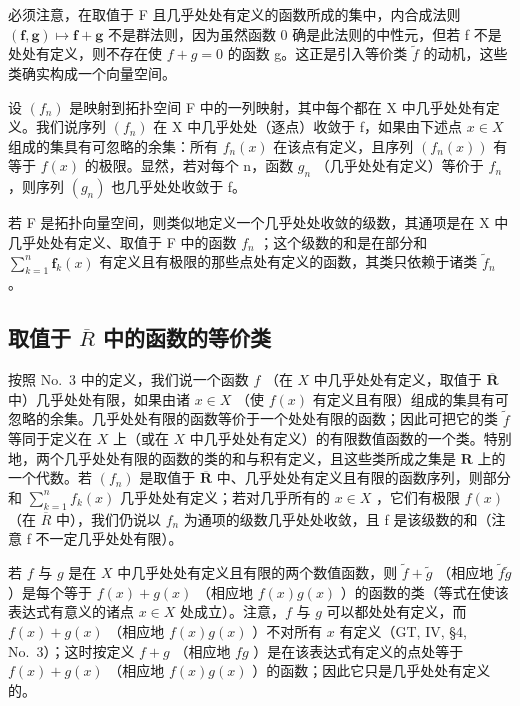 必须注意，在取值于 F 且几乎处处有定义的函数所成的集中，内合成法则 \((\mathbf{f},\mathbf{g})\mapsto\mathbf{f}+\mathbf{g}\) 不是群法则，因为虽然函数 0 确是此法则的中性元，但若 f 不是处处有定义，则不存在使 \(f+g=0\) 的函数 g。这正是引入等价类 \(\widetilde{f}\) 的动机，这些类确实构成一个向量空间。

设 \((f_n)\) 是映射到拓扑空间 F 中的一列映射，其中每个都在 X 中几乎处处有定义。我们说序列 \((f_n)\) 在 X 中几乎处处（逐点）收敛于 f，如果由下述点 \(x \in X\) 组成的集具有可忽略的余集：所有 \(f_n(x)\) 在该点有定义，且序列 \((f_n(x))\) 有等于 \(f(x)\) 的极限。显然，若对每个 n，函数 \(g_n\) （几乎处处有定义）等价于 \(f_n\) ，则序列 \((g_n)\) 也几乎处处收敛于 f。

若 F 是拓扑向量空间，则类似地定义一个几乎处处收敛的级数，其通项是在 X 中几乎处处有定义、取值于 F 中的函数 \(f_{n}\) ；这个级数的和是在部分和 \(\sum_{k=1}^{n}\mathbf{f}_{k}(x)\) 有定义且有极限的那些点处有定义的函数，其类只依赖于诸类 \(\widetilde{f}_{n}\) 。

\subsection{\texorpdfstring{取值于 \(\overline{R}\) 中的函数的等价类}{取值于 R-bar 中的函数的等价类}}

按照 No.~3 中的定义，我们说一个函数 \(f\) （在 \(X\) 中几乎处处有定义，取值于 \(\overline{\mathbf{R}}\) 中）几乎处处有限，如果由诸 \(x \in X\) （使 \(f(x)\) 有定义且有限）组成的集具有可忽略的余集。几乎处处有限的函数等价于一个处处有限的函数；因此可把它的类 \(\widetilde{f}\) 等同于定义在 \(X\) 上（或在 \(X\) 中几乎处处有定义）的有限数值函数的一个类。特别地，两个几乎处处有限的函数的类的和与积有定义，且这些类所成之集是 \(\mathbf{R}\) 上的一个代数。若 \((f_n)\) 是取值于 \(\overline{\mathbf{R}}\) 中、几乎处处有定义且有限的函数序列，则部分和 \(\sum_{k=1}^{n} f_k(x)\) 几乎处处有定义；若对几乎所有的 \(x \in X\) ，它们有极限 \(f(x)\) （在 \(\overline{R}\) 中），我们仍说以 \(f_{n}\) 为通项的级数几乎处处收敛，且 f 是该级数的和（注意 f 不一定几乎处处有限）。

若 \(f\) 与 \(g\) 是在 \(X\) 中几乎处处有定义且有限的两个数值函数，则 \(\widetilde{f} + \widetilde{g}\) （相应地 \(\widetilde{f}\widetilde{g}\) ）是每个等于 \(f(x) + g(x)\) （相应地 \(f(x)g(x)\) ）的函数的类（等式在使该表达式有意义的诸点 \(x \in X\) 处成立）。注意，\(f\) 与 \(g\) 可以都处处有定义，而 \(f(x) + g(x)\) （相应地 \(f(x)g(x)\) ）不对所有 \(x\) 有定义（GT, IV, §4, No.~3）；这时按定义 \(f + g\) （相应地 \(fg\) ）是在该表达式有定义的点处等于 \(f(x) + g(x)\) （相应地 \(f(x)g(x)\) ）的函数；因此它只是几乎处处有定义的。

